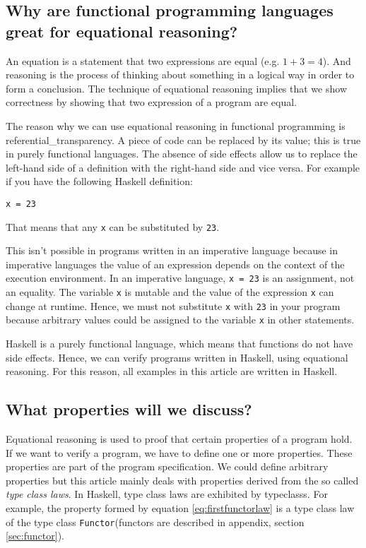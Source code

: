 \subsection{Why are functional programming languages great for equational reasoning?}

An equation is a statement that two expressions are equal (e.g. $1 + 3 = 4$). And reasoning is the process of thinking about something in a logical way in order to form a conclusion. The technique of equational reasoning implies that we show correctness by showing that two expression of a program are equal. 

The reason why we can use equational reasoning in functional programming is \gls{referential_transparency}. A piece of code can be replaced by its value; this is true in purely functional languages. The absence of side effects allow us to replace the left-hand side of a definition with the right-hand side and vice versa. For example if you have the following Haskell definition:
\begin{verbatim}
x = 23
\end{verbatim}
That means that any \verb|x| can be substituted by \verb|23|.

This isn't possible in programs written in an imperative language because in imperative languages the value of an expression depends on the context of the execution environment. In an imperative language, \verb|x = 23| is an assignment, not an equality. The variable \verb|x| is mutable and the value of the expression \verb|x| can change at runtime. Hence, we must not substitute \verb|x| with \verb|23| in your program because arbitrary values could be assigned to the variable \verb|x| in other statements.

Haskell is a purely functional language, which means that functions do not have side effects. Hence, we can verify programs written in Haskell, using equational reasoning. For this reason, all examples in this article are written in Haskell.

\subsection{What properties will we discuss?}

Equational reasoning is used to proof that certain properties of a program hold. If we want to verify a program, we have to define one or more properties. These properties are part of the program specification. We could define arbitrary properties but this article mainly deals with properties derived from the so called \emph{type class laws}. In Haskell, type class laws are exhibited by \glspl{typeclass}. For example, the property formed by equation \ref{eq:firstfunctorlaw} is a type class law of the type class \verb|Functor|(functors are described in appendix, section \ref{sec:functor}).


